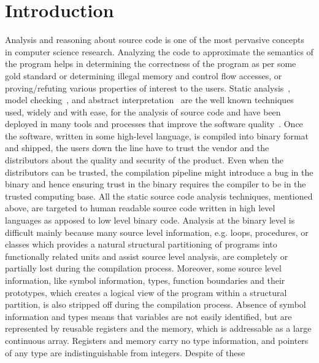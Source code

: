 \chapter{Introduction}\label{sec:ba}
Analysis and reasoning about source code is one of the most pervasive concepts
in computer science research. Analyzing the code to approximate  the semantics
of the program helps in determining the correctness of the program as per some
gold standard or determining illegal memory and control flow accesses, or
proving/refuting various properties of interest to the users. Static
analysis~\cite{Nielson2010}, model checking~\cite{Clarke1981,Queille1982}, and
abstract interpretation~\cite{Cousot1977} are the well known techniques used,
         widely and with ease, for the  analysis of source code and have been
         deployed in many tools and processes that improve the software
         quality~\cite{Xie:2003,Musuvathi:2008,Ivancic:2005,Dwyer:2007,Binkley:2007,Bessey2010,Ball2006}.
         Once the software, written in some high-level language, is compiled
         into binary format and shipped, the users down the line have to trust
         the vendor and the distributors about the quality and security of the
         product. Even when the distributors can be trusted, the compilation
         pipeline might introduce a bug in the binary and hence ensuring trust
         in the binary requires the compiler to be in the trusted computing
         base.  All the static source code analysis techniques, mentioned
         above, are targeted to human readable source code written in high
         level languages as apposed to low level binary code. Analysis at the
         binary level is difficult mainly because many source level
         information, e.g. loops, procedures, or classes which provides a
         natural structural partitioning of programs into functionally related
         units and assist source level analysis, are completely or partially
         lost during the compilation process. Moreover, some source level
         information, like symbol information, types, function boundaries and
         their prototypes, which creates a logical view of the program  within
         a structural partition, is also stripped off during the compilation
         process. Absence of symbol information and types means that variables
         are not easily identified, but are represented by reusable registers
         and the memory, which is addressable as a large continuous array.
         Registers and memory carry no type information, and pointers of any
         type are indistinguishable from integers.  Despite of these
